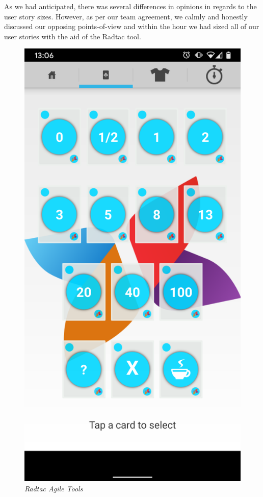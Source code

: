 \documentclass[a4paper,12pt]{article}
\begin{document}
As we had anticipated, there was several differences in opinions in
regards to the user story sizes. However, as per our team agreement,
we calmly and honestly discussed our opposing points-of-view and
within the hour we had sized all of our user stories with the aid of
the Radtac tool.

\begin{figure}[h]
\caption{\textit{Radtac Agile Tools}}
\includegraphics[scale=0.15]{radtac}
\centering
\end{figure}
\end{document}
